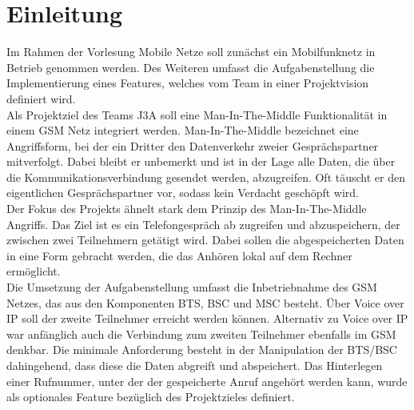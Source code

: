 \section{Einleitung}
Im Rahmen der Vorlesung Mobile Netze soll zunächst ein Mobilfunknetz in Betrieb genommen werden. Des Weiteren umfasst die Aufgabenstellung die Implementierung eines Features, welches vom Team in einer Projektvision definiert wird. \\

Als Projektziel des Teams J3A soll eine Man-In-The-Middle Funktionalität in einem GSM Netz integriert werden. Man-In-The-Middle bezeichnet eine Angriffsform, bei der ein Dritter den Datenverkehr zweier Gesprächspartner mitverfolgt. Dabei bleibt er unbemerkt und ist in der Lage alle Daten, die über die Kommunikationsverbindung gesendet werden, abzugreifen. Oft täuscht er den eigentlichen Gesprächspartner vor, sodass kein Verdacht geschöpft wird.\\

Der Fokus des Projekts ähnelt stark dem Prinzip des Man-In-The-Middle Angriffs. Das Ziel ist es ein Telefongespräch ab zugreifen und abzuspeichern, der zwischen zwei Teilnehmern getätigt wird. Dabei sollen die abgespeicherten Daten in eine Form gebracht werden, die das Anhören lokal auf dem Rechner ermöglicht. \\

Die Umsetzung der Aufgabenstellung umfasst die Inbetriebnahme des GSM Netzes, das aus den Komponenten BTS, BSC und MSC besteht. Über Voice over IP soll der zweite Teilnehmer erreicht werden können. Alternativ zu Voice over IP war anfänglich auch die Verbindung zum zweiten Teilnehmer ebenfalls im GSM denkbar. Die minimale Anforderung besteht in der Manipulation der BTS/BSC dahingehend, dass diese die Daten abgreift und abspeichert. Das Hinterlegen einer Rufnummer, unter der der gespeicherte Anruf angehört werden kann, wurde als optionales Feature bezüglich des Projektzieles definiert.
